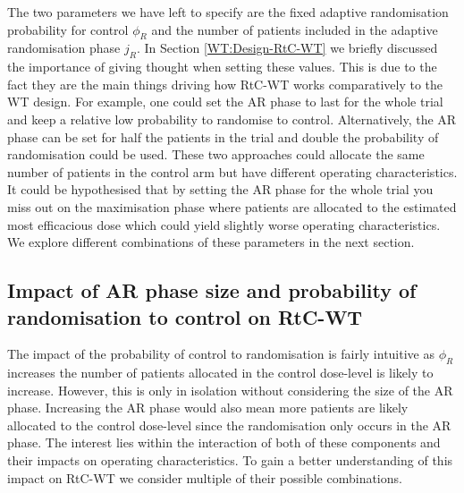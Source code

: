  The two parameters we have left to specify are the fixed adaptive randomisation probability for control $\phi_R$ and the number of patients included in the adaptive randomisation phase $j_R$. In Section \ref{WT:Design-RtC-WT} we briefly discussed the importance of giving thought when setting these values. This is due to the fact they are the main things driving how RtC-WT works comparatively to the WT design. For example, one could set the AR phase to last for the whole trial and keep a relative low probability to randomise to control. Alternatively, the AR phase can be set for half the patients in the trial and double the probability of randomisation could be used. These two approaches could allocate the same number of patients in the control arm but have different operating characteristics. It could be hypothesised that by setting the AR phase for the whole trial you miss out on the maximisation phase where patients are allocated to the estimated most efficacious dose which could yield slightly worse operating characteristics. We explore different combinations of these parameters in the next section. 
 
 \subsection{Impact of AR phase size and probability of randomisation to control on RtC-WT}
 \label{WT:Impact-ARandRTCon-RtC-WT}
 
 The impact of the probability of control to randomisation is fairly intuitive as $\phi_R$ increases the number of patients allocated in the control dose-level is likely to increase. However, this is only in isolation without considering the size of the AR phase. Increasing the AR phase would also mean more patients are likely allocated to the control dose-level since the randomisation only occurs in the AR phase. The interest lies within the interaction of both of these components and their impacts on operating characteristics. To gain a better understanding of this impact on RtC-WT we consider multiple of their possible combinations. 
 
